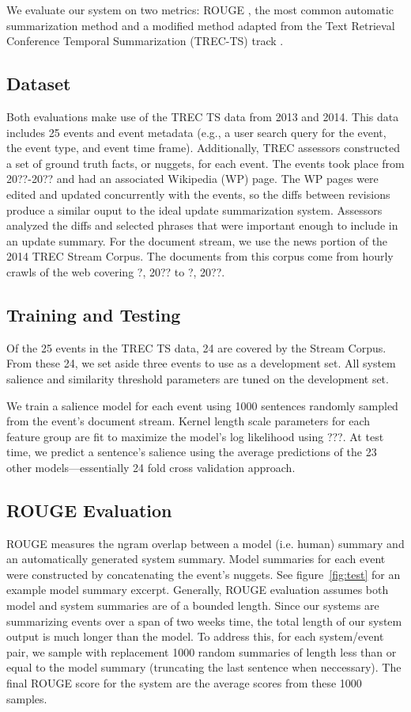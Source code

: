We evaluate our system on two metrics: ROUGE \cite{?}, the most common automatic
summarization method and a modified method adapted 
from the Text Retrieval Conference Temporal Summarization (TREC-TS) track \cite{?}.

\subsection{Dataset}

Both evaluations make use of the TREC TS data from 2013 and 2014. 
This data includes 25 events and event metadata (e.g., a user
search query for the event, the event type, and event time frame).
Additionally, TREC assessors constructed a set of ground truth facts, or 
nuggets, for each event. The events took place from 20??-20?? and had 
an associated Wikipedia (WP) page. The WP pages were edited and updated 
concurrently with the events, so the diffs between revisions produce a similar
ouput to the ideal update summarization system. Assessors analyzed the diffs
and selected phrases that were important enough to include in an update 
summary.  
For the document stream, we use the news portion of the
 2014 TREC Stream Corpus.
The documents from this corpus come from hourly crawls of the web covering 
 ?, 20?? to ?, 20??. 

\subsection{Training and Testing}

Of the 25 events in the TREC TS data, 24 are covered by the Stream Corpus.
From these 24, we set aside three events to use as a development set.
All system salience and similarity threshold parameters are tuned on the
development set.

We train a salience model for each event using 1000 sentences randomly sampled
from the event's document stream. Kernel length scale parameters  for each
feature group are fit to maximize
the model's log likelihood using ???.
At test time, we predict a sentence's salience using the average predictions
of the 23 other models---essentially 24 fold cross validation approach.   

\subsection{ROUGE Evaluation}

ROUGE measures the ngram overlap between a model (i.e. human) summary 
and an automatically generated system summary. 
Model summaries for each event were constructed by concatenating the event's 
nuggets. 
See figure~\ref{fig:test} for an example model summary excerpt.
Generally, ROUGE evaluation assumes both model and system summaries
are of a bounded length. Since our systems are summarizing events over a span
of two weeks time, the total length of our system output is much longer than
the model. To address this, for each system/event pair, we sample with replacement
1000 random summaries of length less than or equal to the model summary 
(truncating the last sentence when neccessary). The final ROUGE score for the 
system are the average scores from these 1000 samples.

